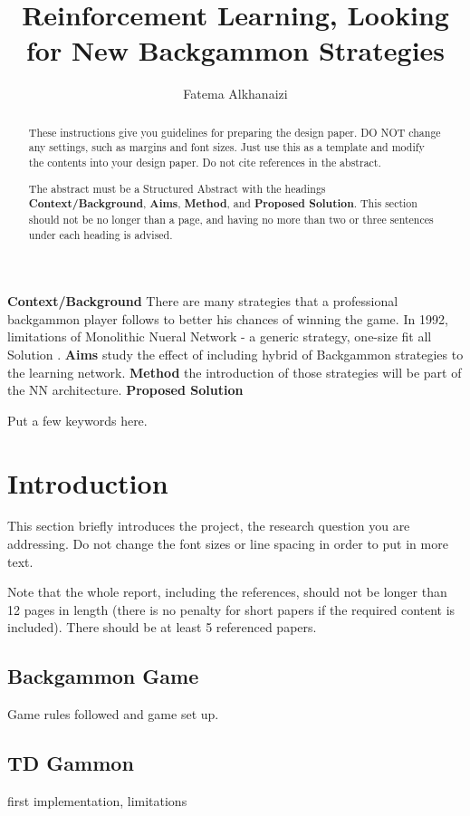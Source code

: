 \documentclass[12pt,a4paper]{article}
\title{Reinforcement Learning, Looking for New Backgammon Strategies}
\author{Fatema Alkhanaizi}
\date{}
\begin{document}
\maketitle

\begin{abstract}
These instructions give you guidelines for preparing the design paper.  DO NOT change any settings, such as margins and font sizes.  Just use this as a template and modify the contents into your design paper.  Do not cite references in the abstract.

The abstract must be a Structured Abstract with the headings {\bf Context/Background}, {\bf Aims}, {\bf Method}, and {\bf Proposed Solution}.  This section should not be no longer than a page, and having no more than two or three sentences under each heading is advised.
\end{abstract}

{\bf Context/Background}
There are many strategies that a professional backgammon player follows to better his chances of winning the game. In 1992, limitations of Monolithic Nueral Network - a generic strategy, one-size fit all Solution .
{\bf Aims}
study the effect of including hybrid of Backgammon strategies to the learning network.
{\bf Method}
the introduction of those strategies will be part of the NN architecture. 
{\bf Proposed Solution}


\begin{keywords}
Put a few keywords here.
\end{keywords}

\section{Introduction}
This section briefly introduces the project, the research question you are addressing.  Do not change the font sizes or line spacing in order to put in more text.

Note that the whole report, including the references, should not be longer than 12 pages in length (there is no penalty for short papers if the required content is included). There should be at least 5 referenced papers.

\subsection{Backgammon Game}
Game rules followed and game set up.

\subsection{TD Gammon}
first implementation, limitations
\end{document}
